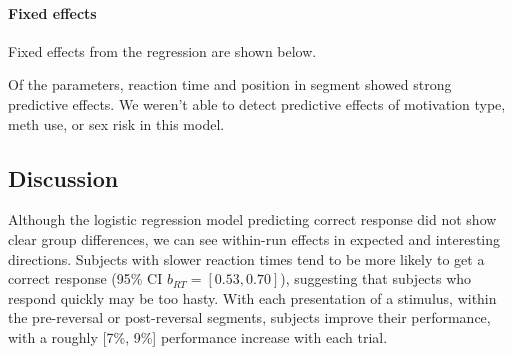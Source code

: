 \documentclass[]{article}
\let\oldparagraph\paragraph
\renewcommand{\paragraph}[1]{\oldparagraph{#1}\mbox{}}
\begin{document}
\paragraph{Fixed effects}\label{fixed-effects}

Fixed effects from the regression are shown below.

Of the parameters, reaction time and position in segment showed strong
predictive effects. We weren't able to detect predictive effects of
motivation type, meth use, or sex risk in this model.

\subsection{Discussion}\label{discussion}

Although the logistic regression model predicting correct response did
not show clear group differences, we can see within-run effects in
expected and interesting directions. Subjects with slower reaction times
tend to be more likely to get a correct response (95\% CI
\(b_{RT}=[0.53, 0.70]\)), suggesting that subjects who respond quickly
may be too hasty. With each presentation of a stimulus, within the
pre-reversal or post-reversal segments, subjects improve their
performance, with a roughly {[}7\%, 9\%{]} performance increase with
each trial.
\end{document}
